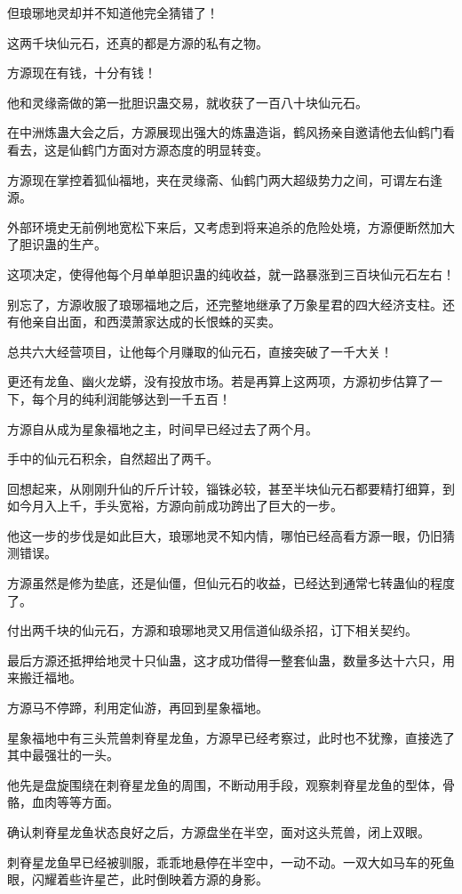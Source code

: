 \begin{this_body}
但琅琊地灵却并不知道他完全猜错了！

这两千块仙元石，还真的都是方源的私有之物。

方源现在有钱，十分有钱！

他和灵缘斋做的第一批胆识蛊交易，就收获了一百八十块仙元石。

在中洲炼蛊大会之后，方源展现出强大的炼蛊造诣，鹤风扬亲自邀请他去仙鹤门看看去，这是仙鹤门方面对方源态度的明显转变。

方源现在掌控着狐仙福地，夹在灵缘斋、仙鹤门两大超级势力之间，可谓左右逢源。

外部环境史无前例地宽松下来后，又考虑到将来追杀的危险处境，方源便断然加大了胆识蛊的生产。

这项决定，使得他每个月单单胆识蛊的纯收益，就一路暴涨到三百块仙元石左右！

别忘了，方源收服了琅琊福地之后，还完整地继承了万象星君的四大经济支柱。还有他亲自出面，和西漠萧家达成的长恨蛛的买卖。

总共六大经营项目，让他每个月赚取的仙元石，直接突破了一千大关！

更还有龙鱼、幽火龙蟒，没有投放市场。若是再算上这两项，方源初步估算了一下，每个月的纯利润能够达到一千五百！

方源自从成为星象福地之主，时间早已经过去了两个月。

手中的仙元石积余，自然超出了两千。

回想起来，从刚刚升仙的斤斤计较，锱铢必较，甚至半块仙元石都要精打细算，到如今月入上千，手头宽裕，方源向前成功跨出了巨大的一步。

他这一步的步伐是如此巨大，琅琊地灵不知内情，哪怕已经高看方源一眼，仍旧猜测错误。

方源虽然是修为垫底，还是仙僵，但仙元石的收益，已经达到通常七转蛊仙的程度了。

付出两千块的仙元石，方源和琅琊地灵又用信道仙级杀招，订下相关契约。

最后方源还抵押给地灵十只仙蛊，这才成功借得一整套仙蛊，数量多达十六只，用来搬迁福地。

方源马不停蹄，利用定仙游，再回到星象福地。

星象福地中有三头荒兽刺脊星龙鱼，方源早已经考察过，此时也不犹豫，直接选了其中最强壮的一头。

他先是盘旋围绕在刺脊星龙鱼的周围，不断动用手段，观察刺脊星龙鱼的型体，骨骼，血肉等等方面。

确认刺脊星龙鱼状态良好之后，方源盘坐在半空，面对这头荒兽，闭上双眼。

刺脊星龙鱼早已经被驯服，乖乖地悬停在半空中，一动不动。一双大如马车的死鱼眼，闪耀着些许星芒，此时倒映着方源的身影。


\end{this_body}
